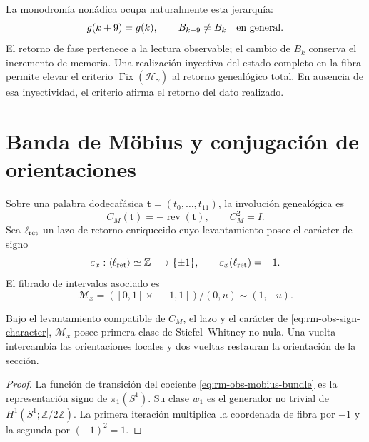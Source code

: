La monodrom\'ia non\'adica ocupa naturalmente esta jerarqu\'ia:
\begin{equation}
 g(k+9)=g(k),
 \qquad
 B_{k+9}\neq B_k\quad\hbox{en general}.
 \label{eq:rm-obs-phase-state-return}
\end{equation}
El retorno de fase pertenece a la lectura observable; el cambio de
\(B_k\) conserva el incremento de memoria. Una realizaci\'on inyectiva del
estado completo en la fibra permite elevar el criterio
\(\operatorname{Fix}(\mathscr H_\gamma)\) al retorno geneal\'ogico total.
En ausencia de esa inyectividad, el criterio afirma el retorno del dato
realizado.

\section{Banda de M\"obius y conjugaci\'on de orientaciones}

Sobre una palabra dodecaf\'asica
\(\mathbf t=(t_0,\ldots,t_{11})\), la involuci\'on geneal\'ogica es
\begin{equation}
 C_M(\mathbf t)=-\operatorname{rev}(\mathbf t),
 \qquad
 C_M^2=I.
 \label{eq:rm-obs-word-involution}
\end{equation}
Sea \(\ell_{\rm ret}\) un lazo de retorno enriquecido cuyo levantamiento
posee el car\'acter de signo
\begin{equation}
 \varepsilon_x:\langle\ell_{\rm ret}\rangle\simeq\mathbb Z
 \longrightarrow\{\pm1\},
 \qquad
 \varepsilon_x(\ell_{\rm ret})=-1.
 \label{eq:rm-obs-sign-character}
\end{equation}
El fibrado de intervalos asociado es
\begin{equation}
 \mathcal M_x
 =([0,1]\times[-1,1])/(0,u)\sim(1,-u).
 \label{eq:rm-obs-mobius-bundle}
\end{equation}

\begin{theorem}
\label{thm:rm-obs-mobius-return}
Bajo el levantamiento compatible de \(C_M\), el lazo y el car\'acter de
\cref{eq:rm-obs-sign-character}, \(\mathcal M_x\) posee primera clase de
Stiefel--Whitney no nula. Una vuelta intercambia las orientaciones locales y
dos vueltas restauran la orientaci\'on de la secci\'on.
\end{theorem}

\begin{proof}
La funci\'on de transici\'on del cociente
\cref{eq:rm-obs-mobius-bundle} es la representaci\'on signo de
\(\pi_1(S^1)\). Su clase \(w_1\) es el generador no trivial de
\(H^1(S^1;\mathbb Z/2\mathbb Z)\). La primera iteraci\'on multiplica la
coordenada de fibra por \(-1\) y la segunda por \((-1)^2=1\).
\end{proof}

